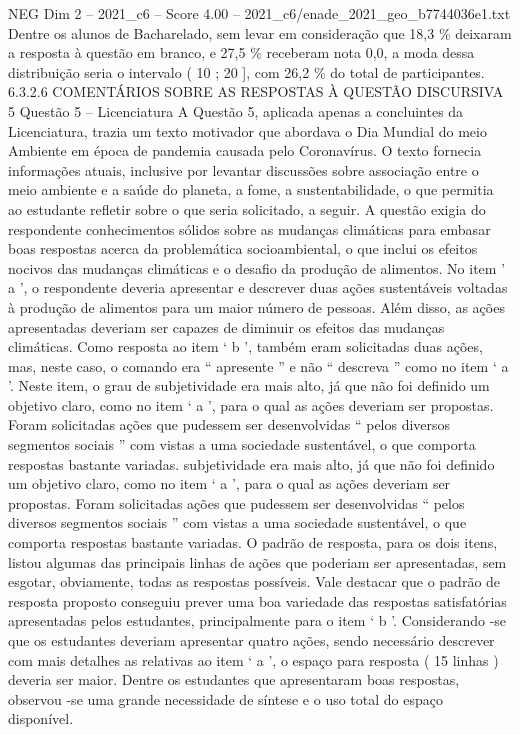\begin{textsample}{NEG Dim 2 – 2021\_c6 – Score 4.00 – 2021\_c6/enade\_2021\_geo\_b7744036e1.txt}
Dentre os alunos de Bacharelado, sem levar em consideração que 18,3 \% deixaram a resposta à questão em branco, e 27,5 \% receberam nota 0,0, a moda dessa distribuição seria o intervalo ( 10 ; 20 ], com 26,2 \% do total de participantes. 6.3.2.6 COMENTÁRIOS SOBRE AS RESPOSTAS À QUESTÃO DISCURSIVA 5 Questão 5 – Licenciatura A Questão 5, aplicada apenas a concluintes da Licenciatura, trazia um texto motivador que abordava o Dia Mundial do meio Ambiente em época de pandemia causada pelo Coronavírus.
O texto fornecia informações atuais, inclusive por levantar discussões sobre associação entre o meio ambiente e a saúde do planeta, a fome, a sustentabilidade, o que permitia ao estudante refletir sobre o que seria solicitado, a seguir.
A questão exigia do respondente conhecimentos sólidos sobre as mudanças climáticas para embasar boas respostas acerca da problemática socioambiental, o que inclui os efeitos nocivos das mudanças climáticas e o desafio da produção de alimentos.
No item ’ a ’, o respondente deveria apresentar e descrever duas ações sustentáveis voltadas à produção de alimentos para um maior número de pessoas.
Além disso, as ações apresentadas deveriam ser capazes de diminuir os efeitos das mudanças climáticas.
Como resposta ao item ‘ b ’, também eram solicitadas duas ações, mas, neste caso, o comando era “ apresente ” e não “ descreva ” como no item ‘ a ’.
Neste item, o grau de subjetividade era mais alto, já que não foi definido um objetivo claro, como no item ‘ a ’, para o qual as ações deveriam ser propostas.
Foram solicitadas ações que pudessem ser desenvolvidas “ pelos diversos segmentos sociais ” com vistas a uma sociedade sustentável, o que comporta respostas bastante variadas. subjetividade era mais alto, já que não foi definido um objetivo claro, como no item ‘ a ’, para o qual as ações deveriam ser propostas.
Foram solicitadas ações que pudessem ser desenvolvidas “ pelos diversos segmentos sociais ” com vistas a uma sociedade sustentável, o que comporta respostas bastante variadas.
O padrão de resposta, para os dois itens, listou algumas das principais linhas de ações que poderiam ser apresentadas, sem esgotar, obviamente, todas as respostas possíveis.
Vale destacar que o padrão de resposta proposto conseguiu prever uma boa variedade das respostas satisfatórias apresentadas pelos estudantes, principalmente para o item ‘ b ’.
Considerando -se que os estudantes deveriam apresentar quatro ações, sendo necessário descrever com mais detalhes as relativas ao item ‘ a ’, o espaço para resposta ( 15 linhas ) deveria ser maior.
Dentre os estudantes que apresentaram boas respostas, observou -se uma grande necessidade de síntese e o uso total do espaço disponível.

\end{textsample}
